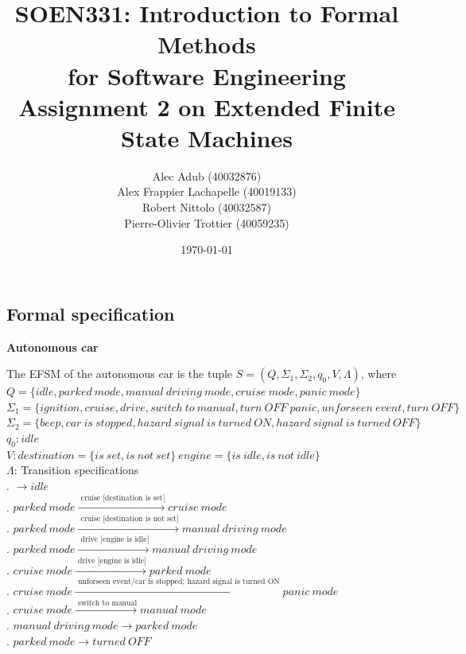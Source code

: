 \documentclass[12pt]{article}
\title{SOEN331: Introduction to Formal Methods\\for Software Engineering\\
Assignment 2 on Extended Finite State Machines}
\author{\begin{tabular}{c}
Alec Adub (40032876) \tabularnewline
Alex Frappier Lachapelle (40019133) \tabularnewline
Robert Nittolo (40032587) \tabularnewline
Pierre-Olivier Trottier (40059235) \tabularnewline\\
\end{tabular}
}
\date{\today}
\begin{document}
\begin{spacing}{1.5}

\maketitle

\newpage

\section{Formal specification}

\noindent \textbf{Autonomous car}

\noindent The EFSM of the autonomous car is the tuple $S = (Q, \Sigma_1, \Sigma_2, q_0, V, \Lambda)$, where\\

\noindent $Q = \{idle, parked~mode, manual~ driving~mode, cruise~mode, panic~mode\}$\\
\noindent $\Sigma_1 = \{ignition, cruise, drive, switch~to~manual, turn~OFF~panic, unforseen~event, turn~OFF\}$\\
\noindent $\Sigma_2 = \{beep, car~is~stopped,  hazard~signal~is~turned~ON, hazard~signal~is~turned~OFF\}$\\
\noindent $q_0: idle$\\
\noindent $V: destination = \{is~set, is~not~ set\}~engine = \{is~idle, is~not~idle\}$\\
\noindent $\Lambda$: Transition specifications\\
. $\rightarrow idle$\\
. $parked~mode \xrightarrow {\text { cruise~[destination~is~set]}} cruise~mode$\\
. $parked~mode \xrightarrow {\text { cruise~[destination~is~not~set]}} manual~driving~mode$\\
. $parked~mode \xrightarrow {\text { drive~[engine~is~idle]}} manual~driving~mode$\\
. $cruise~mode \xrightarrow {\text { drive~[engine~is~idle]}} parked~mode$\\
. $cruise~mode \xrightarrow {\text { unforseen~event/car~is~stopped;~hazard~signal~is~turned~ON}} panic~mode$\\
. $cruise~mode \xrightarrow {\text { switch~to~manual}} manual~mode$\\
. $manual~driving~mode \rightarrow  parked~mode$\\
. $parked~mode \rightarrow   turned~OFF$\\


\end{spacing}
\end{document}

